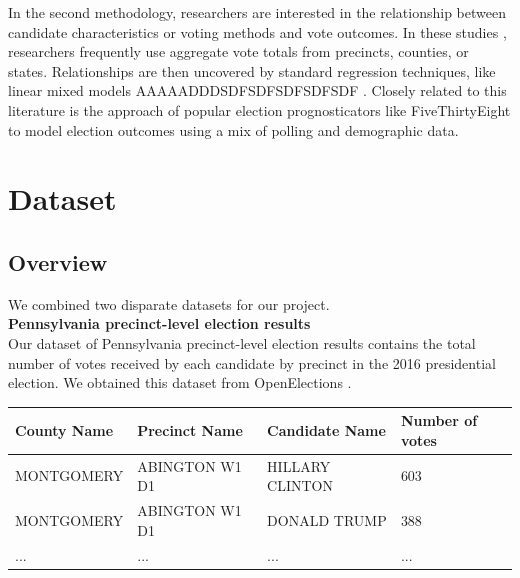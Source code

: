 \documentclass[10pt, letterpaper]{article}
\begin{document}
In the second methodology, researchers are interested in the relationship between candidate characteristics or voting methods and vote outcomes. In these studies \cite{miller1998impact, frisina2008ballot, 10.2307/24371899}, researchers frequently use aggregate vote totals from precincts, counties, or states. Relationships are then uncovered by standard regression techniques, like linear mixed models \cite{10.2307/2585758} AAAAADDDSDFSDFSDFSDFSDF . Closely related to this literature is the approach of popular election prognosticators like FiveThirtyEight \cite{538} to model election outcomes using a mix of polling and demographic data. 

\section{Dataset}

\subsection{Overview}

We combined two disparate datasets for our project. \\

\noindent \textbf{Pennsylvania precinct-level election results} \\
Our dataset of Pennsylvania precinct-level election results contains the total number of votes received by each candidate by precinct in the 2016 presidential election. We obtained this dataset from OpenElections \cite{OpenElections}.

\begin{table}[H]
\begin{center}
\begin{tabular}{ |l|l|l|l| } 
\hline
County Name & Precinct Name & Candidate Name & Number of votes \\
\hline \hline
MONTGOMERY & ABINGTON W1 D1 & HILLARY CLINTON & 603  \\
\hline
MONTGOMERY & ABINGTON W1 D1 & DONALD TRUMP & 388  \\
\hline
... & ...& ... & ...  \\
\hline
\end{tabular}
\end{center}
\end{table}
\end{document}
